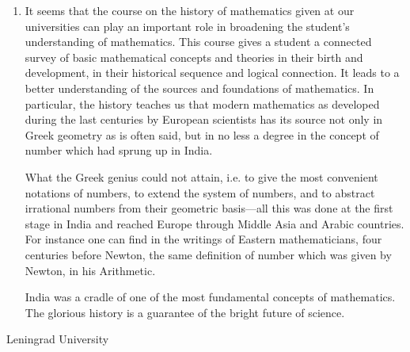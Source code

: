 \begin{enumerate}
This post-graduate system is the main source of the higher school teachers at the level of a lecturer. Due to all the universities we have\pageoriginale now the necessary number of lecturers with the scientific Candidate's degree.

\item It seems that the course on the history of mathematics given at our universities can play an important role in broadening the student's understanding of mathematics. This course gives a student a connected survey of basic mathematical concepts and theories in their birth and development, in their historical sequence and logical connection. It leads to a better understanding of the sources and foundations of mathematics. In particular, the history teaches us that modern mathematics as developed during the last centuries by European scientists has its source not only in Greek geometry as is often said, but in no less a degree in the concept of number which had sprung up in India.

What the Greek genius could not attain, i.e. to give the most convenient notations of numbers, to extend the system of numbers, and to abstract irrational numbers from their geometric basis---all this was done at the first stage in India and reached Europe through Middle Asia and Arabic countries. For instance one can find in the writings of Eastern mathematicians, four centuries before Newton, the same definition of number which was given by Newton, in his Arithmetic.

India was a cradle of one of the most fundamental concepts of mathematics. The glorious history is a guarantee of the bright future of science.
\end{enumerate}

\bigskip

{\fontsize{9pt}{11pt}\selectfont Leningrad University}\relax
